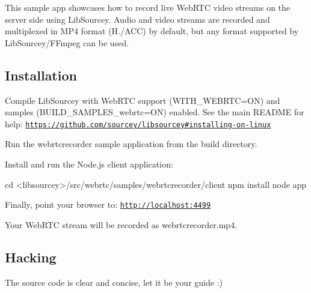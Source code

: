This sample app showcases how to record live Web\+R\+TC video streams on the server side using Lib\+Sourcey. Audio and video streams are recorded and multiplexed in M\+P4 format (H./\+A\+CC) by default, but any format supported by Lib\+Sourcey/\+F\+Fmpeg can be used.

\subsection*{Installation}


\begin{DoxyEnumerate}
\item Compile Lib\+Sourcey with Web\+R\+TC support ({\ttfamily W\+I\+T\+H\+\_\+\+W\+E\+B\+R\+TC=ON}) and samples ({\ttfamily B\+U\+I\+L\+D\+\_\+\+S\+A\+M\+P\+L\+E\+S\+\_\+webrtc=ON}) enabled. See the main R\+E\+A\+D\+ME for help\+: \href{https://github.com/sourcey/libsourcey#installing-on-linux}{\tt https\+://github.\+com/sourcey/libsourcey\#installing-\/on-\/linux}
\item Run the {\ttfamily webrtcrecorder} sample application from the {\ttfamily build} directory.
\end{DoxyEnumerate}
\begin{DoxyEnumerate}
\item Install and run the Node.\+js client application\+:
\end{DoxyEnumerate}


\begin{DoxyCode}
cd <libsourcey>/src/webrtc/samples/webrtcrecorder/client
npm install
node app
\end{DoxyCode}



\begin{DoxyEnumerate}
\item Finally, point your browser to\+: {\ttfamily \href{http://localhost:4499}{\tt http\+://localhost\+:4499}}
\item Your Web\+R\+TC stream will be recorded as {\ttfamily webrtcrecorder.\+mp4}.
\end{DoxyEnumerate}

\subsection*{Hacking}

The source code is clear and concise, let it be your guide \+:) 